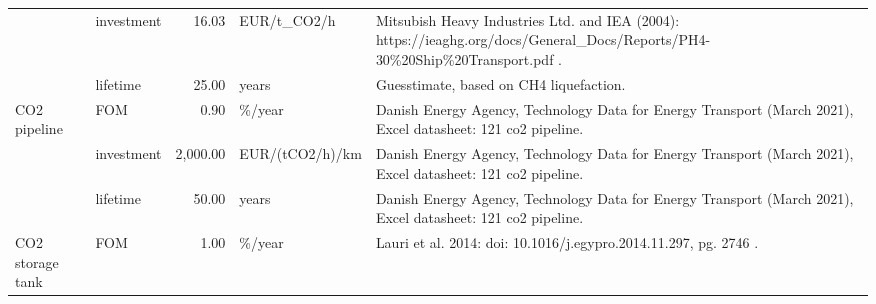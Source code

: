 \begin{longtable}{p{5cm}p{3cm}rp{3cm}p{11cm}}
                      & investment &          16.03 &                       EUR/t\_CO2/h &                                                                                                                                                                                                         Mitsubish Heavy Industries Ltd. and IEA (2004): https://ieaghg.org/docs/General\_Docs/Reports/PH4-30\%20Ship\%20Transport.pdf . \\
                      & lifetime &          25.00 &                             years &                                                                                                                                                                                                                                                                                              Guesstimate, based on CH4 liquefaction. \\
CO2 pipeline & FOM &           0.90 &                            \%/year &                                                                                                                                                                                                                          Danish Energy Agency, Technology Data for Energy Transport (March 2021), Excel datasheet: 121 co2 pipeline. \\
                      & investment &       2,000.00 &                   EUR/(tCO2/h)/km &                                                                                                                                                                                                                          Danish Energy Agency, Technology Data for Energy Transport (March 2021), Excel datasheet: 121 co2 pipeline. \\
                      & lifetime &          50.00 &                             years &                                                                                                                                                                                                                          Danish Energy Agency, Technology Data for Energy Transport (March 2021), Excel datasheet: 121 co2 pipeline. \\
CO2 storage tank & FOM &           1.00 &                            \%/year &                                                                                                                                                                                                                                                                     Lauri et al. 2014: doi: 10.1016/j.egypro.2014.11.297, pg. 2746 . \\

\end{longtable}
